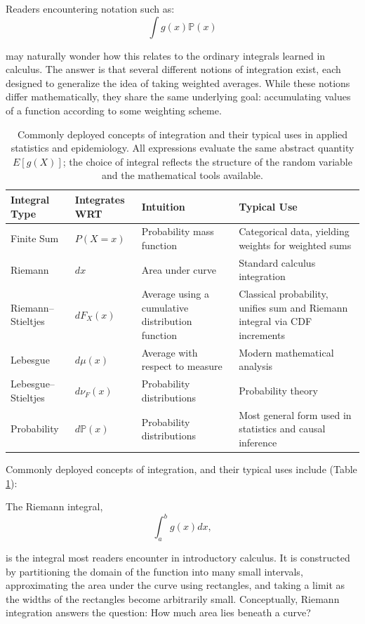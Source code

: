 \documentclass[12pt]{article}
\numberwithin{equation}{section}
\begin{document}
Readers encountering notation such as: 
$$\int g(x)\mathbb{P}(x)$$

\noindent may naturally wonder how this relates to the ordinary integrals learned in calculus. The answer is that several different notions of integration exist, each designed to generalize the idea of taking weighted averages. While these notions differ mathematically, they share the same underlying goal: accumulating values of a function according to some weighting scheme. 

\begin{table}[ht]
\centering
\caption{Commonly deployed concepts of integration and their typical uses in applied statistics and epidemiology. All expressions evaluate the same abstract quantity $E[g(X)]$; the choice of integral reflects the structure of the random variable and the mathematical tools available.}
\label{tab:int_table}
\begin{tabular}{p{3.2cm}p{3.5cm}p{3.2cm}p{4.5cm}}
\hline
\textbf{Integral Type} & \textbf{Integrates WRT} & \textbf{Intuition} & \textbf{Typical Use} \\
\hline
Finite Sum & $P(X{=}x)$ & Probability mass function & Categorical data, yielding weights for weighted sums\\[6pt]
Riemann & $dx$ & Area under curve & Standard calculus integration \\[6pt]
Riemann--Stieltjes & $dF_X(x)$ & Average using a cumulative distribution function & Classical probability, unifies sum and Riemann integral via CDF increments \\[6pt]
Lebesgue & $d\mu(x)$ & Average with respect to measure & Modern mathematical analysis \\[6pt]
Lebesgue--Stieltjes & $d\nu_{F}(x)$ & Probability distributions & Probability theory \\[6pt]
Probability & $d\mathbb{P}(x)$ & Probability distributions & Most general form used in statistics and causal inference \\[6pt]
\hline
\end{tabular}
\end{table}

\newpage

Commonly deployed concepts of integration, and their typical uses include (Table \ref{tab:int_table}):


\noindent The Riemann integral,
$$\int_a^b g(x)dx,$$

\noindent is the integral most readers encounter in introductory calculus. It is constructed by partitioning the domain of the function into many small intervals, approximating the area under the curve using rectangles, and taking a limit as the widths of the rectangles become arbitrarily small. Conceptually, Riemann integration answers the question: How much area lies beneath a curve?
\end{document}
